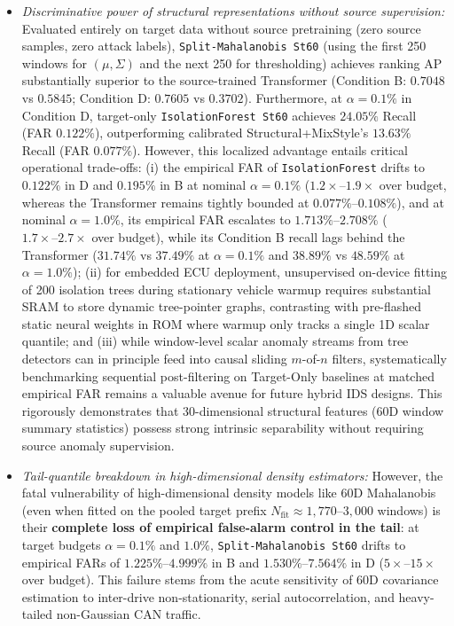 \documentclass[12pt, a4paper, reqno, oneside]{book}
\begin{document}
\begin{itemize}
    \item \textit{Discriminative power of structural representations without source supervision:} Evaluated entirely on target data without source pretraining (zero source samples, zero attack labels), \texttt{Split-Mahalanobis St60} (using the first 250 windows for $(\mu, \Sigma)$ and the next 250 for thresholding) achieves ranking AP substantially superior to the source-trained Transformer (Condition B: $0.7048$ vs $0.5845$; Condition D: $0.7605$ vs $0.3702$). Furthermore, at $\alpha=0.1\%$ in Condition D, target-only \texttt{IsolationForest St60} achieves $24.05\%$ Recall (FAR $0.122\%$), outperforming calibrated Structural+MixStyle's $13.63\%$ Recall (FAR $0.077\%$). However, this localized advantage entails critical operational trade-offs: (i) the empirical FAR of \texttt{IsolationForest} drifts to $0.122\%$ in D and $0.195\%$ in B at nominal $\alpha=0.1\%$ ($1.2\times\text{--}1.9\times$ over budget, whereas the Transformer remains tightly bounded at $0.077\%\text{--}0.108\%$), and at nominal $\alpha=1.0\%$, its empirical FAR escalates to $1.713\%\text{--}2.708\%$ ($1.7\times\text{--}2.7\times$ over budget), while its Condition B recall lags behind the Transformer ($31.74\%$ vs $37.49\%$ at $\alpha=0.1\%$ and $38.89\%$ vs $48.59\%$ at $\alpha=1.0\%$); (ii) for embedded ECU deployment, unsupervised on-device fitting of 200 isolation trees during stationary vehicle warmup requires substantial SRAM to store dynamic tree-pointer graphs, contrasting with pre-flashed static neural weights in ROM where warmup only tracks a single 1D scalar quantile; and (iii) while window-level scalar anomaly streams from tree detectors can in principle feed into causal sliding $m$-of-$n$ filters, systematically benchmarking sequential post-filtering on Target-Only baselines at matched empirical FAR remains a valuable avenue for future hybrid IDS designs. This rigorously demonstrates that 30-dimensional structural features (60D window summary statistics) possess strong intrinsic separability without requiring source anomaly supervision.
    \item \textit{Tail-quantile breakdown in high-dimensional density estimators:} However, the fatal vulnerability of high-dimensional density models like 60D Mahalanobis (even when fitted on the pooled target prefix $N_{\text{fit}} \approx 1{,}770\text{--}3{,}000$ windows) is their \textbf{complete loss of empirical false-alarm control in the tail}: at target budgets $\alpha=0.1\%$ and $1.0\%$, \texttt{Split-Mahalanobis St60} drifts to empirical FARs of $1.225\%\text{--}4.999\%$ in B and $1.530\%\text{--}7.564\%$ in D ($5\times\text{--}15\times$ over budget). This failure stems from the acute sensitivity of 60D covariance estimation to inter-drive non-stationarity, serial autocorrelation, and heavy-tailed non-Gaussian CAN traffic.

\end{itemize}
\end{document}

